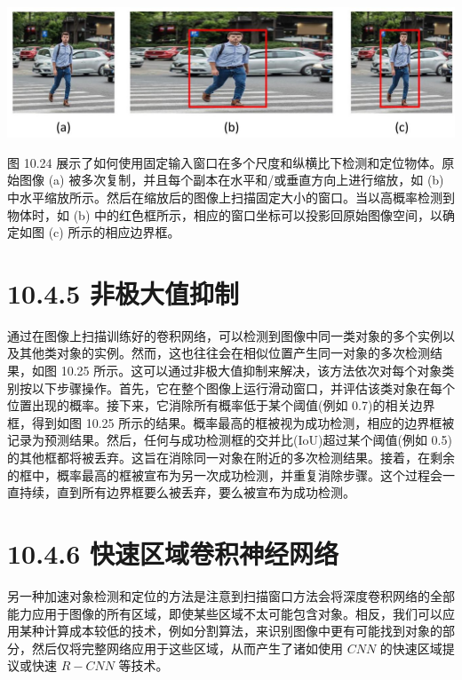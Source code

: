 \documentclass[10pt]{report}
\begin{document}
\begin{center}
\includegraphics[max width=1.0\textwidth]{images/0194e279-9b28-703a-88f4-c3ac21e2010d_333_227_348_1339_391_0.jpg}
\end{center}
\hspace*{3em} 

图 10.24 展示了如何使用固定输入窗口在多个尺度和纵横比下检测和定位物体。原始图像 (a) 被多次复制，并且每个副本在水平和/或垂直方向上进行缩放，如 (b) 中水平缩放所示。然后在缩放后的图像上扫描固定大小的窗口。当以高概率检测到物体时，如 (b) 中的红色框所示，相应的窗口坐标可以投影回原始图像空间，以确定如图 (c) 所示的相应边界框。

\section*{10.4.5 非极大值抑制}

通过在图像上扫描训练好的卷积网络，可以检测到图像中同一类对象的多个实例以及其他类对象的实例。然而，这也往往会在相似位置产生同一对象的多次检测结果，如图 10.25 所示。这可以通过非极大值抑制来解决，该方法依次对每个对象类别按以下步骤操作。首先，它在整个图像上运行滑动窗口，并评估该类对象在每个位置出现的概率。接下来，它消除所有概率低于某个阈值(例如 0.7)的相关边界框，得到如图 10.25 所示的结果。概率最高的框被视为成功检测，相应的边界框被记录为预测结果。然后，任何与成功检测框的交并比(IoU)超过某个阈值(例如 0.5)的其他框都将被丢弃。这旨在消除同一对象在附近的多次检测结果。接着，在剩余的框中，概率最高的框被宣布为另一次成功检测，并重复消除步骤。这个过程会一直持续，直到所有边界框要么被丢弃，要么被宣布为成功检测。

\section*{10.4.6 快速区域卷积神经网络}

另一种加速对象检测和定位的方法是注意到扫描窗口方法会将深度卷积网络的全部能力应用于图像的所有区域，即使某些区域不太可能包含对象。相反，我们可以应用某种计算成本较低的技术，例如分割算法，来识别图像中更有可能找到对象的部分，然后仅将完整网络应用于这些区域，从而产生了诸如使用 \({CNN}\) 的快速区域提议或快速 \(R - {CNN}\) 等技术。
\end{document}
